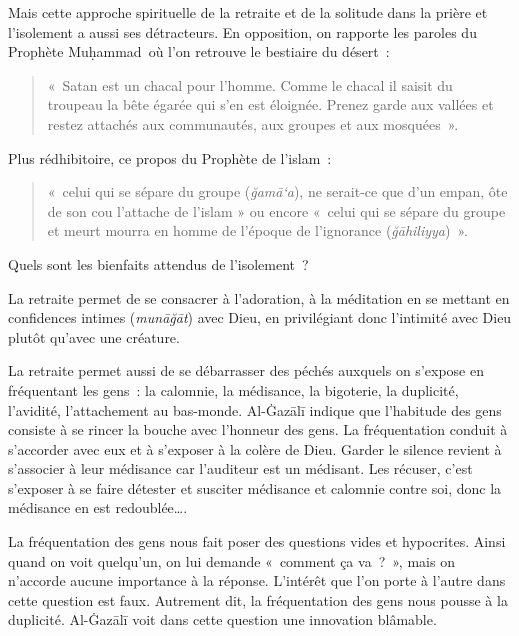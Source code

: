 Mais cette approche spirituelle de la retraite et de la solitude dans la
prière et l'isolement a aussi ses détracteurs. En opposition, on
rapporte les paroles du Prophète Muḥammad~où l'on retrouve le bestiaire
du désert~:

\begin{quote}
«~Satan est un chacal pour l'homme. Comme le chacal il saisit du
troupeau la bête égarée qui s'en est éloignée. Prenez garde aux vallées
et restez attachés aux communautés, aux groupes et aux mosquées~».
\end{quote}

Plus rédhibitoire, ce propos du Prophète de l'islam~: 
\begin{quote}
   «~celui qui se
sépare du groupe (\emph{ğamā`a}), ne serait-ce que d'un empan, ôte de
son cou l'attache de l'islam » ou encore «~celui qui se sépare du groupe
et meurt mourra en homme de l'époque de l'ignorance
(\emph{ğāhiliyya})~». 
\end{quote}

Quels sont les bienfaits attendus de l'isolement~?

La retraite permet de se consacrer à l'adoration, à la méditation en se
mettant en confidences intimes (\emph{munāğāt}) avec Dieu, en
privilégiant donc l'intimité avec Dieu plutôt qu'avec une créature.

La retraite permet aussi de se débarrasser des péchés auxquels on
s'expose en fréquentant les gens~: la calomnie, la médisance, la
bigoterie, la duplicité, l'avidité, l'attachement au bas-monde.
Al-Ġazālī \label{theol:AlGazali30} indique que l'habitude des gens consiste à se rincer la bouche
avec l'honneur des gens. La fréquentation conduit à s'accorder avec eux
et à s'exposer à la colère de Dieu. Garder le silence revient à
s'associer à leur médisance car l'auditeur est un médisant. Les récuser,
c'est s'exposer à se faire détester et susciter médisance et calomnie
contre soi, donc la médisance en est redoublée\ldots{}.

La fréquentation des gens nous fait poser des questions vides et
hypocrites. Ainsi quand on voit quelqu'un, on lui demande «~comment ça
va~?~», mais on n'accorde aucune importance à la réponse. L'intérêt que
l'on porte à l'autre dans cette question est faux. Autrement dit, la
fréquentation des gens nous pousse à la duplicité. Al-Ġazālī \label{theol:AlGazali11} voit dans
cette question une innovation blâmable.

